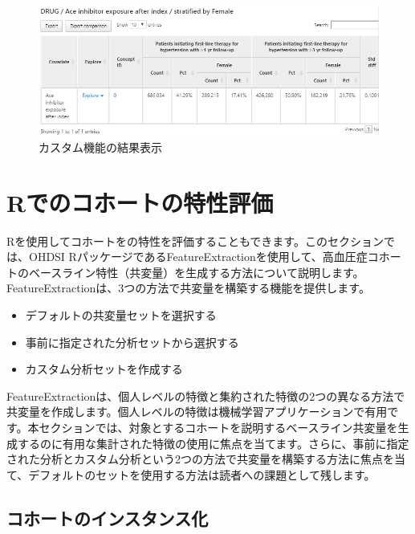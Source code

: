 \documentclass[
  11pt]{book}
\providecommand{\tightlist}{%
  \setlength{\itemsep}{0pt}\setlength{\parskip}{0pt}}
\theoremstyle{definition}
\theoremstyle{definition}
\theoremstyle{definition}
\theoremstyle{definition}
\theoremstyle{remark}
\begin{document}
\begin{figure}

{\centering \includegraphics[width=1\linewidth]{images/Characterization/atlasCharacterizationCustomFeatureResults} 

}

\caption{カスタム機能の結果表示}\label{fig:atlasCharacterizationCustomFeatureResults}
\end{figure}

\section{Rでのコホートの特性評価}\label{rux3067ux306eux30b3ux30dbux30fcux30c8ux306eux7279ux6027ux8a55ux4fa1}

Rを使用してコホートをの特性を評価することもできます。このセクションでは、OHDSI RパッケージであるFeatureExtractionを使用して、高血圧症コホートのベースライン特性（共変量）を生成する方法について説明します。FeatureExtractionは、3つの方法で共変量を構築する機能を提供します。 

\begin{itemize}
\tightlist
\item
  デフォルトの共変量セットを選択する
\item
  事前に指定された分析セットから選択する
\item
  カスタム分析セットを作成する
\end{itemize}

FeatureExtractionは、個人レベルの特徴と集約された特徴の2つの異なる方法で共変量を作成します。個人レベルの特徴は機械学習アプリケーションで有用です。本セクションでは、対象とするコホートを説明するベースライン共変量を生成するのに有用な集計された特徴の使用に焦点を当てます。さらに、事前に指定された分析とカスタム分析という2つの方法で共変量を構築する方法に焦点を当て、デフォルトのセットを使用する方法は読者への課題として残します。

\subsection{コホートのインスタンス化}\label{ux30b3ux30dbux30fcux30c8ux306eux30a4ux30f3ux30b9ux30bfux30f3ux30b9ux5316}
\end{document}

